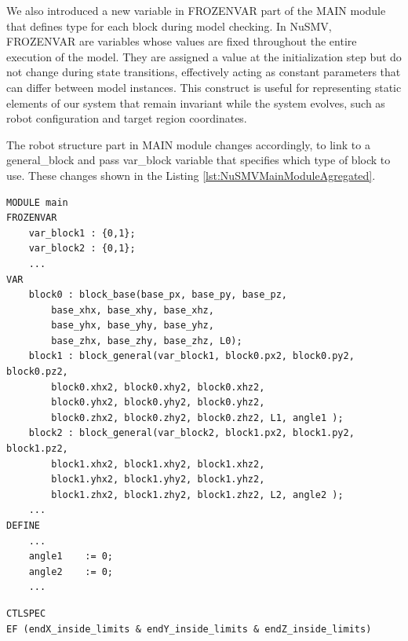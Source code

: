 We also introduced a new variable in FROZENVAR part of the MAIN module that defines 
type for each block during model checking. 
In NuSMV, FROZENVAR are variables whose values are fixed throughout the 
entire execution of the model. They are assigned a value at the initialization 
step but do not change during state transitions, effectively acting as 
constant parameters that can differ between model instances. 
This construct is useful for representing static elements of our system that
remain invariant while the system evolves, such as robot configuration 
and target region coordinates.

The robot structure part in MAIN module changes accordingly, to link to 
a general\_block and pass var\_block variable that specifies which type of block to use.
These changes shown in the Listing \ref{lst:NuSMVMainModuleAgregated}.

\begin{lstlisting}[language=NuSMV, caption={Changes in main module to go over different types of blocks}, 
    label={lst:NuSMVMainModuleAgregated}]
MODULE main
FROZENVAR
    var_block1 : {0,1};
    var_block2 : {0,1};
    ...
VAR
    block0 : block_base(base_px, base_py, base_pz,
        base_xhx, base_xhy, base_xhz,
        base_yhx, base_yhy, base_yhz,
        base_zhx, base_zhy, base_zhz, L0);
    block1 : block_general(var_block1, block0.px2, block0.py2, block0.pz2,
        block0.xhx2, block0.xhy2, block0.xhz2,
        block0.yhx2, block0.yhy2, block0.yhz2,
        block0.zhx2, block0.zhy2, block0.zhz2, L1, angle1 );
    block2 : block_general(var_block2, block1.px2, block1.py2, block1.pz2,
        block1.xhx2, block1.xhy2, block1.xhz2,
        block1.yhx2, block1.yhy2, block1.yhz2,
        block1.zhx2, block1.zhy2, block1.zhz2, L2, angle2 );
    ...
DEFINE
    ...
    angle1    := 0;
    angle2    := 0;
    ...
\end{lstlisting}


\begin{lstlisting}[language=NuSMV, caption={Reachability condition in CTL specification}, 
    label={lst:CTLSpec}]
CTLSPEC 
EF (endX_inside_limits & endY_inside_limits & endZ_inside_limits)
\end{lstlisting}





